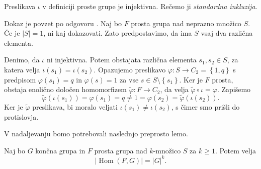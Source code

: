 \begin{trditev}\label{opm_standardna_inkluzija}
Preslikava $\iota$ v definiciji proste grupe je injektivna. Rečemo ji \emph{standardna inkluzija}.
\end{trditev}
\begin{dokaz}
  Dokaz je povzet po odgovoru \cite{math_stack_4689399_standardna_inkluzija}.
Naj bo $F$ prosta grupa nad neprazno množico $S$. Če je $\lvert S \rvert = 1$, ni kaj dokazovati. Zato predpostavimo, da ima $S$ vsaj dva različna elementa.

Denimo, da $\iota$ ni injektivna. Potem obstajata različna elementa $s_1, s_2 \in S$, za katera velja $\iota(s_1) = \iota(s_2)$. Opazujemo preslikavo $\varphi: S \to C_2 = \left\{ 1, q\right\}$ s predpisom
$\varphi(s_1) = q$ in $\varphi(s) = 1$ za vse $s \in  S \setminus \left\{  s_1 \right\}$. Ker je $F$ prosta, obstaja enolično določen homomorfizem $\tilde{\varphi} : F \to C_2$, da velja $\tilde{\varphi} \circ \iota = \varphi$.
Zapišemo \begin{equation*}
\tilde{\varphi}(\iota(s_1)) = \varphi(s_1) = q \neq 1 = \varphi(s_2) = \tilde{\varphi}(\iota(s_2)).
\end{equation*}  
Ker je $\tilde{\varphi}$ preslikava, bi moralo veljati $\iota(s_1) \neq \iota(s_2)$, s čimer smo prišli do protislovja.
\end{dokaz}
V nadaljevanju bomo potrebovali naslednjo preprosto lemo.
\begin{lema}
\label{lem_moc_homomorfizmov_proste_grupe}
Naj bo $G$ končna grupa in $F$ prosta grupa nad $k$-množico $S$ za $k \ge 1$. Potem velja \begin{equation*}
\lvert \operatorname{Hom}(F, G) \rvert = \lvert G \rvert^{k}.  
\end{equation*}  
\end{lema}

